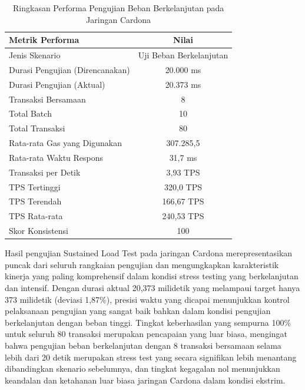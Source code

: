 \begin{table}[h!]
  \centering
  \begin{tabular}{|l|c|}
    \hline
    \textbf{Metrik Performa}        & \textbf{Nilai}          \\
    \hline
    Jenis Skenario                  & Uji Beban Berkelanjutan \\
    \hline
    Durasi Pengujian (Direncanakan) & 20.000 ms               \\
    \hline
    Durasi Pengujian (Aktual)       & 20.373 ms               \\
    \hline
    Transaksi Bersamaan             & 8                       \\
    \hline
    Total Batch                     & 10                      \\
    \hline
    Total Transaksi                 & 80                      \\
    \hline
    Rata-rata Gas yang Digunakan    & 307.285,5               \\
    \hline
    Rata-rata Waktu Respons         & 31,7 ms                 \\
    \hline
    Transaksi per Detik             & 3,93 TPS                \\
    \hline
    TPS Tertinggi                   & 320,0 TPS               \\
    \hline
    TPS Terendah                    & 166,67 TPS              \\
    \hline
    TPS Rata-rata                   & 240,53 TPS              \\
    \hline
    Skor Konsistensi                & 100                     \\
    \hline
  \end{tabular}
  \caption{Ringkasan Performa Pengujian Beban Berkelanjutan pada Jaringan Cardona}
  \label{tab:sustained_load_summary}
\end{table}
Hasil pengujian Sustained Load Test pada jaringan Cardona merepresentasikan puncak dari seluruh rangkaian pengujian dan mengungkapkan karakteristik kinerja yang paling komprehensif dalam kondisi stress testing yang berkelanjutan dan intensif. Dengan durasi aktual 20,373 milidetik yang melampaui target hanya 373 milidetik (deviasi 1,87\%), presisi waktu yang dicapai menunjukkan kontrol pelaksanaan pengujian yang sangat baik bahkan dalam kondisi pengujian berkelanjutan dengan beban tinggi. Tingkat keberhasilan yang sempurna 100\% untuk seluruh 80 transaksi merupakan pencapaian yang luar biasa, mengingat bahwa pengujian beban berkelanjutan dengan 8 transaksi bersamaan selama lebih dari 20 detik merupakan stress test yang secara signifikan lebih menantang dibandingkan skenario sebelumnya, dan tingkat kegagalan nol menunjukkan keandalan dan ketahanan luar biasa jaringan Cardona dalam kondisi ekstrim.
